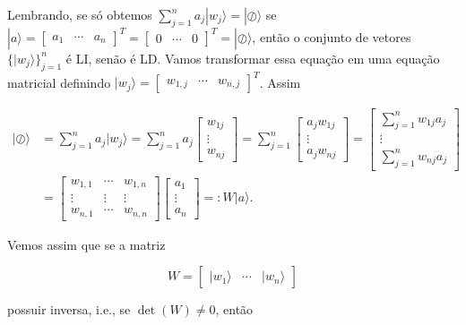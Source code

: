 \documentclass[11pt]{article}
\begin{document}
Lembrando, se só obtemos
\(\sum_{j=1}^{n}a_{j}|w_{j}\rangle=|\oslash\rangle\) se
\(|a\rangle=\begin{bmatrix} a_{1} & \cdots & a_{n} \end{bmatrix}^{T}=\begin{bmatrix} 0 & \cdots & 0 \end{bmatrix}^{T}=|\oslash\rangle\),
então o conjunto de vetores \(\{|w_{j}\rangle\}_{j=1}^{n}\) é LI, senão
é LD. Vamos transformar essa equação em uma equação matricial definindo
\(|w_{j}\rangle=\begin{bmatrix} w_{1,j} & \cdots & w_{n,j} \end{bmatrix}^{T}\).
Assim

\begin{align}
|\oslash\rangle & = \sum_{j=1}^{n}a_{j}|w_{j}\rangle = \sum_{j=1}^{n}a_{j}\begin{bmatrix} w_{1j} \\ \vdots \\ w_{nj} \end{bmatrix} = \sum_{j=1}^{n}\begin{bmatrix} a_{j}w_{1j} \\ \vdots \\ a_{j}w_{nj} \end{bmatrix} = \begin{bmatrix} \sum_{j=1}^{n}w_{1j}a_{j} \\ \vdots \\ \sum_{j=1}^{n}w_{nj}a_{j} \end{bmatrix} \\
& = \begin{bmatrix} w_{1,1} & \cdots & w_{1,n} \\ \vdots & \vdots & \vdots \\  w_{n,1} & \cdots & w_{n,n} \end{bmatrix}\begin{bmatrix} a_{1} \\ \vdots \\ a_{n} \end{bmatrix} =: W|a\rangle.
\end{align}

Vemos assim que se a matriz

\begin{equation}
W=\begin{bmatrix} |w_{1}\rangle & \cdots & |w_{n}\rangle \end{bmatrix}
\end{equation}

possuir inversa, i.e., se \(\det(W)\ne 0\), então
\end{document}
